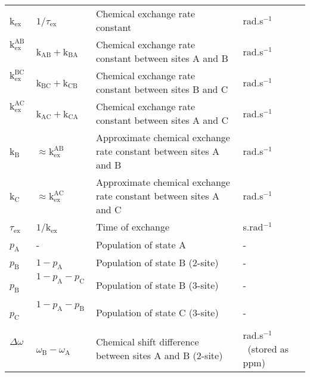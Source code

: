 \documentclass[a4paper,11pt,twoside,openright]{book}
\begin{document}
{\begin{landscape}
\begin{center}
\begin{small}
\begin{longtable}{llll}
$\textrm{k}_{\textrm{ex}}$\              & $1 / \tau_{\textrm{ex}}$\                      & Chemical exchange rate constant                                               & rad.s$^{-1}$\  \\
$\textrm{k}_{\textrm{ex}}^{\textrm{AB}}$\            & $\textrm{k}_{\textrm{AB}}+ \textrm{k}_{\textrm{BA}}$\                   & Chemical exchange rate constant between sites A and B                         & rad.s$^{-1}$\  \\
$\textrm{k}_{\textrm{ex}}^{\textrm{BC}}$\            & $\textrm{k}_{\textrm{BC}}+ \textrm{k}_{\textrm{CB}}$\                   & Chemical exchange rate constant between sites B and C                         & rad.s$^{-1}$\  \\
$\textrm{k}_{\textrm{ex}}^{\textrm{AC}}$\            & $\textrm{k}_{\textrm{AC}}+ \textrm{k}_{\textrm{CA}}$\                   & Chemical exchange rate constant between sites A and C                         & rad.s$^{-1}$\  \\
$\textrm{k}_{\textrm{B}}$\               & $\approx \textrm{k}_{\textrm{ex}}^{\textrm{AB}}$\                & Approximate chemical exchange rate constant between sites A and B             & rad.s$^{-1}$\  \\
$\textrm{k}_{\textrm{C}}$\               & $\approx \textrm{k}_{\textrm{ex}}^{\textrm{AC}}$\                & Approximate chemical exchange rate constant between sites A and C             & rad.s$^{-1}$\  \\
$\tau_{\textrm{ex}}$\              & $1 / \textrm{k}_{\textrm{ex}}$\                      & Time of exchange                                                              & s.rad$^{-1}$\  \\
$p_{\textrm{A}}$\               & -                              & Population of state A                                                         & - \\
$p_{\textrm{B}}$\               & $1-p_{\textrm{A}}$\                         & Population of state B (2-site)                                                & - \\
$p_{\textrm{B}}$\               & $1-p_{\textrm{A}}-p_{\textrm{C}}$\                     & Population of state B (3-site)                                                & - \\
$p_{\textrm{C}}$\               & $1-p_{\textrm{A}}-p_{\textrm{B}}$\                     & Population of state C (3-site)                                                & - \\
$\Delta\omega $\               & $\omega_{\textrm{B}}-\omega_{\textrm{A}}$\               & Chemical shift difference between sites A and B (2-site)                      & rad.s$^{-1}$\  (stored as ppm) \\

\end{longtable}
\end{small}
\end{center}
\end{landscape}}
\end{document}
